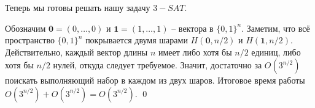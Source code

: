 Теперь мы готовы решать нашу задачу $3-SAT$.


Обозначим $\mathbf 0 = (0, \ldots, 0)$ и $\mathbf 1 = (1, \ldots, 1)$ -- вектора в $\{0, 1\}^n$. Заметим, что всё пространство $\{0, 1\}^n$ покрывается двумя шарами $H(\mathbf 0, n/2)$ и $H(\mathbf 1, n/2)$. Действительно, каждый вектор длины $n$ имеет либо хотя бы $n/2$ единиц, либо хотя бы $n/2$ нулей, откуда следует требуемое. Значит, достаточно за $O(3^{n/2})$ поискать выполняющий набор в каждом из двух шаров. Итоговое время работы $O(3^{n/2}) + O(3^{n/2}) = O(3^{n/2})$. \qed




